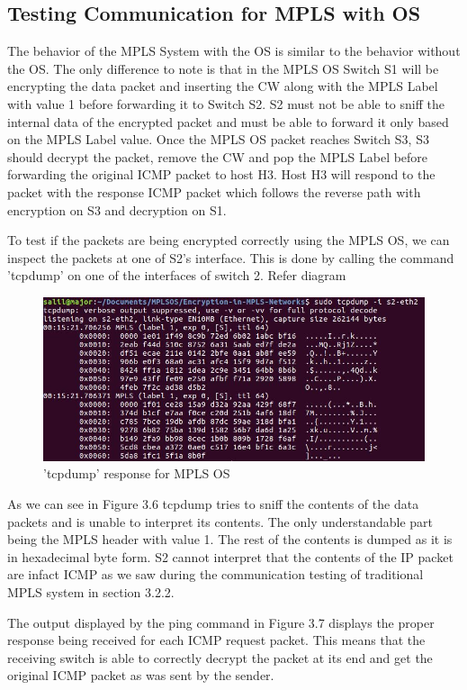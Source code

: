 \subsection{Testing Communication for MPLS with OS}
The behavior of the MPLS System with the OS is similar to the behavior without the OS. The only difference to note is that in the MPLS OS Switch S1 will be encrypting the data packet and inserting the CW along with the MPLS Label with value 1 before forwarding it to Switch S2. S2 must not be able to sniff the internal data of the encrypted packet and must be able to forward it only based on the MPLS Label value. Once the MPLS OS packet reaches Switch S3, S3 should decrypt the packet, remove the CW and pop the MPLS Label before forwarding the original ICMP packet to host H3. Host H3 will respond to the packet with the response ICMP packet which follows the reverse path with encryption on S3 and decryption on S1.

To test if the packets are being encrypted correctly using the MPLS OS, we can inspect the packets at one of S2's interface. This is done by calling the command 'tcpdump' on one of the interfaces of switch 2. Refer diagram

\begin{figure}[H]
   \centering\includegraphics[width=\textwidth]{images/15_TCP_Dump_Capture_for_OS.JPG}
   \caption{'tcpdump' response for MPLS OS}
    \label{fig:compbest}
\end{figure}

As we can see in Figure 3.6 tcpdump tries to sniff the contents of the data packets and is unable to interpret its contents. The only understandable part being the MPLS header with value 1. The rest of the contents is dumped as it is in hexadecimal byte form. S2 cannot interpret that the contents of the IP packet are infact ICMP as we saw during the communication testing of traditional MPLS system in section 3.2.2.

The output displayed by the ping command in Figure 3.7 displays the proper response being received for each ICMP request packet. This means that the receiving switch is able to correctly decrypt the packet at its end and get the original ICMP packet as was sent by the sender.

